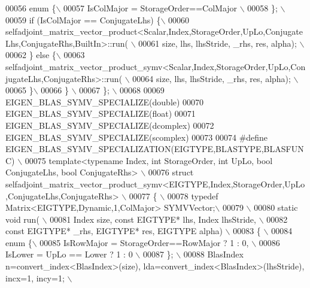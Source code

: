 \begin{DoxyCode}
00056 \textcolor{preprocessor}{    enum \{\(\backslash\)}
00057 \textcolor{preprocessor}{      IsColMajor = StorageOrder==ColMajor \(\backslash\)}
00058 \textcolor{preprocessor}{    \}; \(\backslash\)}
00059 \textcolor{preprocessor}{    if (IsColMajor == ConjugateLhs) \{\(\backslash\)}
00060 \textcolor{preprocessor}{     
       selfadjoint\_matrix\_vector\_product<Scalar,Index,StorageOrder,UpLo,ConjugateLhs,ConjugateRhs,BuiltIn>::run( \(\backslash\)}
00061 \textcolor{preprocessor}{        size, lhs, lhsStride, \_rhs, res, alpha);  \(\backslash\)}
00062 \textcolor{preprocessor}{    \} else \{\(\backslash\)}
00063 \textcolor{preprocessor}{     
       selfadjoint\_matrix\_vector\_product\_symv<Scalar,Index,StorageOrder,UpLo,ConjugateLhs,ConjugateRhs>::run( \(\backslash\)}
00064 \textcolor{preprocessor}{        size, lhs, lhsStride, \_rhs, res, alpha);  \(\backslash\)}
00065 \textcolor{preprocessor}{    \}\(\backslash\)}
00066 \textcolor{preprocessor}{  \} \(\backslash\)}
00067 \textcolor{preprocessor}{\}; \(\backslash\)}
00068 \textcolor{preprocessor}{}
00069 EIGEN\_BLAS\_SYMV\_SPECIALIZE(\textcolor{keywordtype}{double})
00070 EIGEN\_BLAS\_SYMV\_SPECIALIZE(\textcolor{keywordtype}{float})
00071 EIGEN\_BLAS\_SYMV\_SPECIALIZE(dcomplex)
00072 EIGEN\_BLAS\_SYMV\_SPECIALIZE(scomplex)
00073 
00074 \textcolor{preprocessor}{#define EIGEN\_BLAS\_SYMV\_SPECIALIZATION(EIGTYPE,BLASTYPE,BLASFUNC) \(\backslash\)}
00075 \textcolor{preprocessor}{template<typename Index, int StorageOrder, int UpLo, bool ConjugateLhs, bool ConjugateRhs> \(\backslash\)}
00076 \textcolor{preprocessor}{struct selfadjoint\_matrix\_vector\_product\_symv<EIGTYPE,Index,StorageOrder,UpLo,ConjugateLhs,ConjugateRhs> \(\backslash\)}
00077 \textcolor{preprocessor}{\{ \(\backslash\)}
00078 \textcolor{preprocessor}{typedef Matrix<EIGTYPE,Dynamic,1,ColMajor> SYMVVector;\(\backslash\)}
00079 \textcolor{preprocessor}{\(\backslash\)}
00080 \textcolor{preprocessor}{static void run( \(\backslash\)}
00081 \textcolor{preprocessor}{Index size, const EIGTYPE*  lhs, Index lhsStride, \(\backslash\)}
00082 \textcolor{preprocessor}{const EIGTYPE* \_rhs, EIGTYPE* res, EIGTYPE alpha) \(\backslash\)}
00083 \textcolor{preprocessor}{\{ \(\backslash\)}
00084 \textcolor{preprocessor}{  enum \{\(\backslash\)}
00085 \textcolor{preprocessor}{    IsRowMajor = StorageOrder==RowMajor ? 1 : 0, \(\backslash\)}
00086 \textcolor{preprocessor}{    IsLower = UpLo == Lower ? 1 : 0 \(\backslash\)}
00087 \textcolor{preprocessor}{  \}; \(\backslash\)}
00088 \textcolor{preprocessor}{  BlasIndex n=convert\_index<BlasIndex>(size), lda=convert\_index<BlasIndex>(lhsStride), incx=1, incy=1; \(\backslash\)}

\end{DoxyCode}
